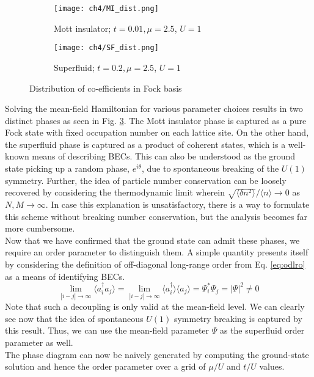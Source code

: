 \begin{figure}[!htb]
    \centering
    \begin{subfigure}[b]{0.48\textwidth}  %
        \centering
        \texttt{[image: ch4/MI\_dist.png]}
        \caption{Mott insulator; $t = 0.01, \mu = 2.5$, $U = 1$}
        \label{fig:mi_dist}
    \end{subfigure}
    \hspace{1em}  %
    \begin{subfigure}[b]{0.48\textwidth}
        \centering
        \texttt{[image: ch4/SF\_dist.png]}
        \caption{Superfluid; $t = 0.2, \mu = 2.5$, $U = 1$}
        \label{fig:sf_dist}
    \end{subfigure}
    \caption{Distribution of co-efficients in Fock basis}
    \label{fig:dists}
\end{figure}
\FloatBarrier \!\!\!\!\!\!\!\!\!\!\!

Solving the mean-field Hamiltonian for various parameter choices results in two distinct phases as seen in Fig. \ref{fig:dists}. The Mott insulator phase is captured as a pure Fock state with fixed occupation number on each lattice site. On the other hand, the superfluid phase is captured as a product of coherent states, which is a well-known means of describing BECs\cite{leggett2008, annett2003}. This can also be understood as the ground state picking up a random phase, $e^{i\theta}$, due to spontaneous breaking of the $U(1)$ symmetry. Further, the idea of particle number conservation can be loosely recovered by considering the thermodynamic limit wherein $\sqrt{\langle \delta n^2 \rangle}/\langle n \rangle \to 0$ as $N, M \to \infty$. In case this explanation is unsatisfactory, there is a way to formulate this scheme without breaking number conservation\cite{leggett2008}, but the analysis becomes far more cumbersome.
\vspace{0.5cm}\\
Now that we have confirmed that the ground state can admit these phases, we require an order parameter to distinguish them. A simple quantity presents itself by considering the definition of off-diagonal long-range order from Eq. \eqref{eq:odlro} as a means of identifying BECs.
\begin{equation}
    \lim_{|i-j| \to \infty} \langle a_i^{\dagger}a_j\rangle = \lim_{|i-j| \to \infty} \langle a_i^{\dagger}\rangle \langle a_j\rangle = \Psi_i^* \Psi_j = |\Psi|^2 \neq 0
\end{equation}
Note that such a decoupling is only valid at the mean-field level. We can clearly see now that the idea of spontaneous $U(1)$ symmetry breaking is captured by this result. Thus, we can use the mean-field parameter $\Psi$ as the superfluid order parameter as well.
\vspace{0.5cm}\\
The phase diagram can now be naively generated by computing the ground-state solution and hence the order parameter over a grid of $\mu/U$ and $t/U$ values.

